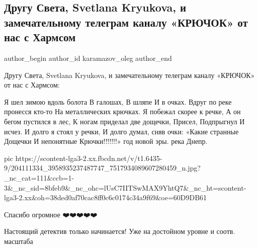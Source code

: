  
 
 
 
 
 
\subsection{Другу Света, Svetlana Kryukova, и замечательному телеграм каналу «КРЮЧОК» от нас с Хармсом}
\label{sec:18_06_2021.fb.karamazov_oleg.1.harms_krjuchok}
\ifcmt
 author_begin
   author_id karamazov_oleg
 author_end
\fi

Другу Света, Svetlana Kryukova, и замечательному телеграм каналу «КРЮЧОК» от нас с Хармсом:

\begin{multicols}{3}
\obeycr
\noindent Я шел зимою вдоль болота
В галошах,
В шляпе
И в очках.
\smallskip
Вдруг по реке пронесся кто-то
На металлических крючках.
Я побежал скорее к речке,
А он бегом пустился в лес,
\smallskip
К ногам приделал две дощечки,
Присел,
Подпрыгнул
И исчез.
\smallskip
И долго я стоял у речки,
И долго думал, сняв очки:
«Какие странные
Дощечки
И непонятные
Крючки!!!!!!!»
 год новой эры. река Днепр.
\restorecr
\end{multicols}

\ifcmt
  pic https://scontent-lga3-2.xx.fbcdn.net/v/t1.6435-9/204111334_3958935237487747_7517934089607280459_n.jpg?_nc_cat=111&ccb=1-3&_nc_sid=8bfeb9&_nc_ohc=lUsC7IITSwMAX9YhtQ7&_nc_ht=scontent-lga3-2.xx&oh=38ded0af70cac8ff0c6c0174c34a9f69&oe=60D9DB61
\fi

\begin{itemize}
Спасибо огромное ❤️❤️❤️❤️❤️


Настоящий детектив только начинается!
Уже на достойном уровне и соотв. масштаба
\end{itemize}
